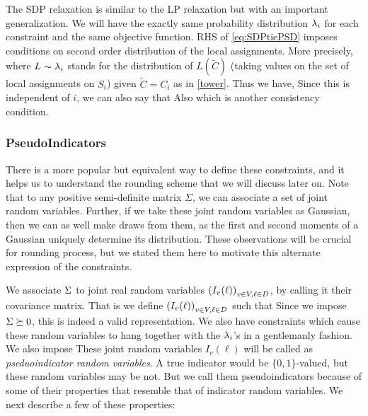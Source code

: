 The SDP relaxation is similar to the LP relaxation but with an important generalization. 
We will have the exactly same probability distribution $\lambda_{i}$ for each constraint and the same objective function. 
RHS of \ref{eq:SDPtiePSD} imposes conditions on second order distribution of the local assignments. 
More precisely,
 where $L \sim\lambda_i$ stands for the distribution of $L(\tilde{C})$ (taking values on the set of local assignments on $S_i$) given $\tilde{C} = C_i$ as in \ref{tower}.
Thus we have, 
Since this is independent of $i$, we can also say that 
Also 
which is another consistency condition.

\subsubsection{PseudoIndicators}
There is a more popular but equivalent way to define these constraints, and it helps us to understand the rounding scheme that we will discuss later on. 
Note that to any positive semi-definite matrix $\Sigma$, we can associate a set of joint random variables. 
Further, if we take these joint random variables as Gaussian, then we can as well make draws from them, as the first and second moments of a Gaussian  uniquely determine its distribution. 
These observations will be crucial for rounding process, but we stated them here to motivate this alternate expression of the constraints. 

We associate $\Sigma$ to joint real random variables $\left(I_v(\ell)\right)_{v\in V, \ell \in D}$, by calling it their covariance matrix. That is we define $\left(I_v(\ell)\right)_{v\in V, \ell \in D}$ such that
Since we impose $\Sigma \succeq 0$, this is indeed a valid representation. 
We also have constraints which cause these random variables to hang together with the $\lambda_{i}$'s in a gentlemanly fashion. We also impose
These joint random variables $I_v(\ell)$ will be called as \textit{pseduoindicator random variables}. A true indicator would be $\{ 0, 1\}$-valued, but these random variables may be not. But we call them pseudoindicators because of some of their properties that resemble that of indicator random variables. We next describe a few of these properties: 

